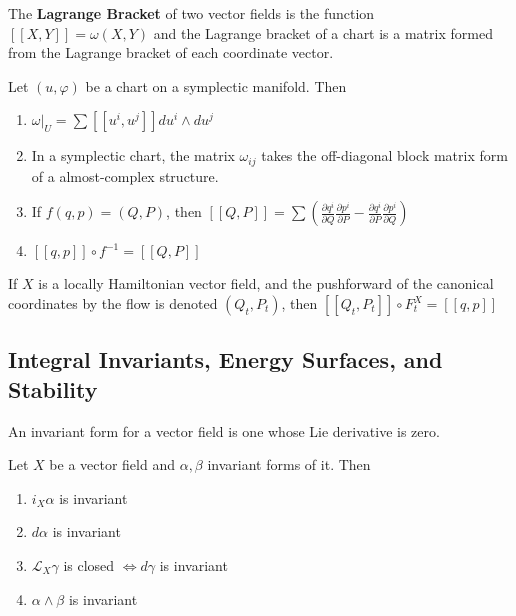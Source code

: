 \documentclass{article}
\begin{document}
\begin{defn}

The \textbf{Lagrange Bracket} of two vector fields is the function $ [[X,Y]] = \omega(X,Y) $ and the Lagrange bracket of a chart is a matrix formed from the Lagrange bracket of each coordinate vector.

\end{defn}

\begin{thm}

Let $(u, \varphi)$ be a chart on a symplectic manifold. Then

\begin{enumerate}
    \item $\omega \vert_U = \sum [[u^i, u^j]]du^i \wedge du^j$
    \item In a symplectic chart, the matrix $\omega_{ij}$ takes the off-diagonal block matrix form of a almost-complex structure.
    \item If $f(q,p) = (Q,P)$, then $[[Q,P]] = \sum \left( \frac{\partial q^i}{\partial Q} \frac{\partial p^i}{\partial P}   - \frac{\partial q^i}{\partial P} \frac{\partial p^i}{\partial Q} \right) $ 
    \item $ [[q,p]]\circ f^{-1} = [[Q, P]] $
\end{enumerate}

\end{thm}

\begin{thm}

If $X$ is a locally Hamiltonian vector field, and the pushforward of the canonical coordinates by the flow is denoted $(Q_t,P_t)$, then $[[Q_t,P_t]]\circ F^X_t = [[q,p]]$

\end{thm}

\subsection{Integral Invariants, Energy Surfaces, and Stability}

\begin{defn}

An invariant form for a vector field is one whose Lie derivative is zero.

\end{defn}

\begin{prop}

Let $X$ be a vector field and $\alpha, \beta$ invariant forms of it. Then 
\begin{enumerate}
    \item $i_X\alpha$ is invariant
    \item $d\alpha$ is invariant
    \item $\mathcal{L}_X \gamma$ is closed $\iff d\gamma$ is invariant
    \item $\alpha \wedge \beta$ is invariant
\end{enumerate}

\end{prop}
\end{document}
